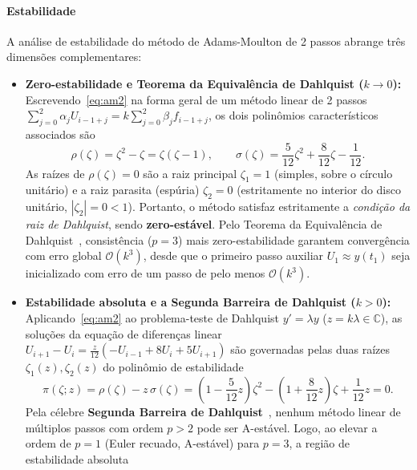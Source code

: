 \documentclass[12pt, a4paper]{article}
\begin{document}
\paragraph{Estabilidade} A análise de estabilidade do método de Adams-Moulton de 2 passos abrange três dimensões
complementares:
\begin{itemize}
  \item \textbf{Zero-estabilidade e Teorema da Equivalência de Dahlquist ($k \to 0$):} Escrevendo~\eqref{eq:am2} na forma
    geral de um método linear de 2 passos $\sum_{j=0}^2 \alpha_j U_{i-1+j} = k\sum_{j=0}^2 \beta_j f_{i-1+j}$, os dois
    polinômios característicos associados são
    \begin{equation}\label{eq:rho-sigma-am2}
      \rho(\zeta) = \zeta^2 - \zeta = \zeta(\zeta - 1), \qquad
      \sigma(\zeta) = \frac{5}{12}\zeta^2 + \frac{8}{12}\zeta - \frac{1}{12}.
    \end{equation}
    As raízes de $\rho(\zeta) = 0$ são a raiz principal $\zeta_1 = 1$ (simples, sobre o círculo unitário) e a raiz
    parasita (espúria) $\zeta_2 = 0$ (estritamente no interior do disco unitário, $|\zeta_2| = 0 < 1$). Portanto, o
    método satisfaz estritamente a \emph{condição da raiz de Dahlquist}, sendo \textbf{zero-estável}. Pelo Teorema da
    Equivalência de Dahlquist~\cite{suli2003,leveque2007}, consistência ($p = 3$) mais zero-estabilidade garantem
    convergência com erro global $\mathcal{O}(k^3)$, desde que o primeiro passo auxiliar $U_1 \approx y(t_1)$ seja inicializado
    com erro de um passo de pelo menos $\mathcal{O}(k^3)$.
  \item \textbf{Estabilidade absoluta e a Segunda Barreira de Dahlquist ($k > 0$):} Aplicando~\eqref{eq:am2} ao
    problema-teste de Dahlquist $y' = \lambda y$ ($z = k\lambda \in \mathbb{C}$), as soluções da equação de diferenças
    linear $U_{i+1} - U_i = \frac{z}{12}(-U_{i-1} + 8U_i + 5U_{i+1})$ são governadas pelas duas raízes $\zeta_1(z),
    \zeta_2(z)$ do polinômio de estabilidade
    \begin{equation}\label{eq:pi-am2}
      \pi(\zeta; z) = \rho(\zeta) - z\,\sigma(\zeta)
      = \left(1 - \frac{5}{12}z\right)\zeta^2 - \left(1 + \frac{8}{12}z\right)\zeta + \frac{1}{12}z = 0.
    \end{equation}
    Pela célebre \textbf{Segunda Barreira de Dahlquist}~\cite{hairer1993,leveque2007}, nenhum método linear de múltiplos
    passos com ordem $p > 2$ pode ser A-estável. Logo, ao elevar a ordem de $p = 1$ (Euler
    recuado, A-estável) para $p = 3$, a região de estabilidade absoluta

\end{itemize}
\end{document}
